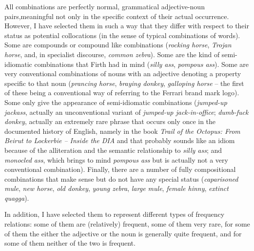 
All combinations are perfectly normal, grammatical adjective\hyp{}noun  pairs,\linebreak meaningful not only in the specific context of their actual occurrence. However, I have selected them in such a way that they differ with respect to their status as potential collocations  (in the sense of typical combinations of words). Some are compounds or compound like combinations (\textit{rocking horse}, \textit{Trojan horse}, and, in specialist discourse, \textit{common zebra}). Some are the kind of semi\hyp{}idiomatic  combinations that Firth had in mind (\textit{silly ass}, \textit{pompous ass}). Some are very conventional  combinations of nouns  with an adjective  denoting a property specific to that noun (\textit{prancing horse}, \textit{braying donkey}, \textit{galloping horse} -- the first of these being a conventional  way of referring to the Ferrari brand mark logo). Some only give the appearance of semi\hyp{}idiomatic  combinations (\textit{jumped-up jackass}, actually an unconventional variant of \textit{jumped-up jack-in-office}; \textit{dumb-fuck donkey}, actually an extremely rare phrase that occurs only once in the documented history of English, namely in the book \textit{Trail of the Octopus: From Beirut to Lockerbie -- Inside the DIA} and that probably sounds like an idiom  because of the alliteration and the semantic  relationship to \textit{silly ass}; and \textit{monocled ass}, which brings to mind \textit{pompous ass} but is actually not a very conventional  combination). Finally, there are a number of fully compositional  combinations that make sense but do not have any special status (\textit{caparisoned mule}, \textit{new horse}, \textit{old donkey}, \textit{young zebra}, \textit{large mule}, \textit{female hinny}, \textit{extinct quagga}).

In addition, I have selected them to represent different types of frequency  relations: some of them are (relatively) frequent, some of them very rare, for some of them the either the adjective  or the noun  is generally quite frequent, and for some of them neither of the two is frequent.\largerpage[2]

